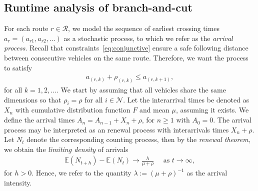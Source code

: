 \documentclass[a4paper]{article}
\theoremstyle{definition}
\theoremstyle{plain}
\begin{document}
\subsection{Runtime analysis of branch-and-cut}
\label{sec:runtime}

For each route $r \in \mathcal{R}$, we model the sequence of earliest crossing times
$a_{r} = (a_{r1}, a_{r2}, \dots)$ as a stochastic process, to which we refer as
the \textit{arrival process}. Recall that constraints~\eqref{eq:conjunctive}
ensure a safe following distance between consecutive vehicles on the same route.
Therefore, we want the process to satisfy
\begin{align*}
  a_{(r, k)} + \rho_{(r,k)} \leq a_{(r, k + 1)} ,
\end{align*}
for all $k = 1, 2, \dots$. We start by assuming that all vehicles share the same
dimensions so that $\rho_{i} = \rho$ for all $i \in \mathcal{N}$.
%
Let the interarrival times be denoted as $X_{n}$ with cumulative distribution
function $F$ and mean $\mu$, assuming it exists. We define the arrival times
$A_{n} = A_{n-1} + X_{n} + \rho$, for $n \geq 1$ with $A_{0} = 0$.
%
The arrival process may be interpreted as an renewal process with interarrivals
times $X_{n} + \rho$.
%
%
Let $N_{t}$ denote the corresponding counting process, then by the \textit{renewal
  theorem}, we obtain the \textit{limiting density} of arrivals
%
\begin{align*}
  \mathbb{E}(N_{t + h}) - \mathbb{E}(N_{t}) \rightarrow \frac{h}{\mu + \rho} \quad \text{ as } t \rightarrow \infty ,
\end{align*}
for $h > 0$. Hence, we refer to the quantity $\lambda := {(\mu + \rho)}^{-1}$ as the
arrival intensity.

%
%
\end{document}

